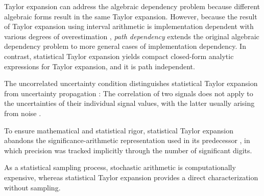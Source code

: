 \documentclass[twoside]{article}
\numberwithin{equation}{section}
\begin{document}
Taylor expansion can address the algebraic dependency problem because different algebraic forms result in the same Taylor expansion.
However, because the result of Taylor expansion using interval arithmetic is implementation dependent with various degrees of overestimation \cite{Taylor_Models, Taylor_Forms_Limits,Interval_Global_Optimization}, \emph{path dependency} extends the original algebraic dependency problem to more general cases of implementation dependency.
In contrast, statistical Taylor expansion yields compact closed-form analytic expressions for Taylor expansion, and it is path independent.

The uncorrelated uncertainty condition distinguishes statistical Taylor expansion from uncertainty propagation \cite{Uncertainty_Propagation}:
The correlation of two signals does not apply to the uncertainties of their individual signal values, with the latter usually arising from noise \cite{Statistical_Methods}.

To ensure mathematical and statistical rigor, statistical Taylor expansion abandons the significance-arithmetic representation used in its predecessor \cite{Prev_Precision_Arithmetic}, in which precision was tracked implicitly through the number of significant digits.

As a statistical sampling process, stochastic arithmetic \cite{Stochastic_Arithmetic, CADNA_library} is computationally expensive, whereas statistical Taylor expansion provides a direct characterization without sampling.
\end{document}
